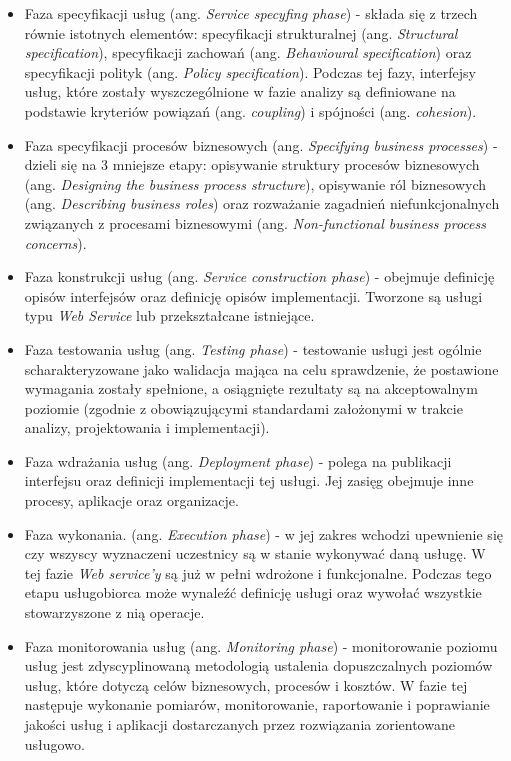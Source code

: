 \begin{itemize}
\item{Faza specyfikacji usług (ang. \emph{Service specyfing phase}) - składa się z trzech równie istotnych elementów: specyfikacji strukturalnej (ang. \emph{Structural specification}), specyfikacji zachowań (ang. \emph{Behavioural specification}) oraz specyfikacji polityk (ang. \emph{Policy specification}). Podczas tej fazy, interfejsy usług, które zostały wyszczególnione w fazie analizy są definiowane na podstawie kryteriów powiązań (ang. \emph{coupling}) i spójności (ang. \emph{cohesion}).}

\item{Faza specyfikacji procesów biznesowych (ang. \emph{Specifying business processes}) - dzieli się na 3 mniejsze etapy: opisywanie struktury procesów biznesowych (ang. \emph{Designing the business process structure}), opisywanie ról biznesowych (ang. \emph{Describing business roles}) oraz rozważanie zagadnień niefunkcjonalnych związanych z procesami biznesowymi (ang. \emph{Non-functional business process concerns}).}

\item{Faza konstrukcji usług (ang. \emph{Service construction phase}) - obejmuje definicję opisów interfejsów oraz definicję opisów implementacji. Tworzone są usługi typu \emph{Web Service} lub przekształcane istniejące.}

\item{Faza testowania usług (ang. \emph{Testing phase}) - testowanie usługi jest ogólnie scharakteryzowane jako walidacja mająca na celu sprawdzenie, że postawione wymagania zostały spełnione, a osiągnięte rezultaty są na akceptowalnym poziomie (zgodnie z obowiązującymi standardami założonymi w trakcie analizy, projektowania i implementacji).} 

\item{Faza wdrażania usług (ang. \emph{Deployment phase}) - polega na publikacji interfejsu oraz definicji implementacji tej usługi. Jej zasięg obejmuje inne procesy, aplikacje oraz organizacje.}

\item{Faza wykonania. (ang. \emph{Execution phase}) - w jej zakres wchodzi upewnienie się czy wszyscy wyznaczeni uczestnicy są w stanie wykonywać daną usługę. W tej fazie \emph{Web service'y} są już w pełni wdrożone i funkcjonalne. Podczas tego etapu usługobiorca może wynaleźć definicję usługi oraz wywołać wszystkie stowarzyszone z nią operacje.}

\item{Faza monitorowania usług (ang. \emph{Monitoring phase}) - monitorowanie poziomu usług jest zdyscyplinowaną metodologią
ustalenia dopuszczalnych poziomów usług, które dotyczą celów biznesowych, procesów i kosztów. W fazie tej następuje wykonanie pomiarów, monitorowanie, raportowanie i poprawianie jakości usług i aplikacji dostarczanych przez rozwiązania zorientowane usługowo. \cite{PapaZog}}
\end{itemize}

